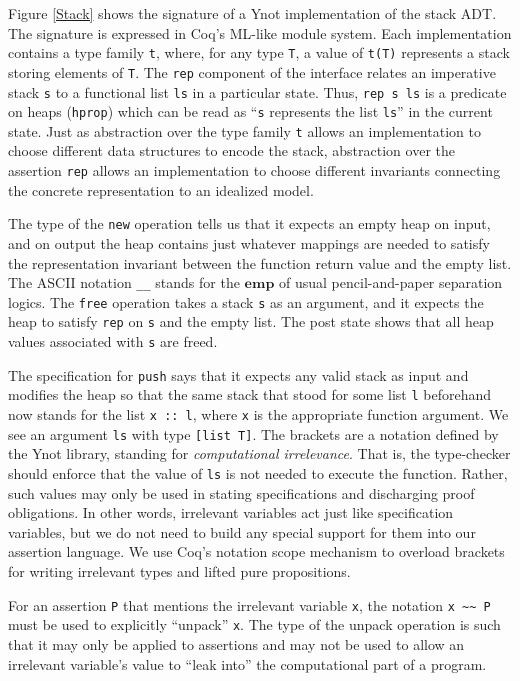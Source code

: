 \documentclass[preprint,nocopyrightspace]{sigplanconf}
\newcommand{\cd}[1]{\texttt{#1}}
\newcommand{\emp}{\mathbf{emp}}
\begin{document}
Figure \ref{Stack} shows the signature of a Ynot implementation of the
stack ADT.  The signature is expressed in Coq's ML-like module system.
Each implementation contains a type family \cd{t}, where, for any
type \cd{T}, a value of \cd{t(T)} represents a stack storing elements
of \cd{T}.  The \cd{rep} component of the interface relates an
imperative stack \cd{s} to a functional list \cd{ls} in a
particular state.  Thus, \cd{rep s ls} is a predicate on heaps
(\cd{hprop}) which can be read as ``\cd{s} represents the list \cd{ls}'' in the
current state.  Just as abstraction over the type family \cd{t} allows
an implementation to choose different data structures to encode the
stack, abstraction over the assertion \cd{rep} allows an
implementation to choose different invariants connecting the concrete
representation to an idealized model.  

The type of the \cd{new} operation tells us that it expects an empty heap on input, and on output the heap contains just whatever mappings are needed to satisfy the representation invariant between the function return value and the empty list.  The ASCII notation \cd{\_\_} stands for the $\emp$ of usual pencil-and-paper separation logics.  The \cd{free} operation takes a stack \cd{s} as an argument, and it expects the heap to satisfy \cd{rep} on \cd{s} and the empty list.  The post state shows that all heap values associated with \cd{s} are freed.

The specification for \cd{push} says that it expects any valid stack as input and modifies the heap so that the same stack that stood for some list \cd{l} beforehand now stands for the list \cd{x :: l}, where \cd{x} is the appropriate function argument.  We see an argument \cd{ls} with type \cd{[list T]}.  The brackets are a notation defined by the Ynot library, standing for \emph{computational irrelevance}.  That is, the type-checker should enforce that the value of \cd{ls} is not needed to execute the function.  Rather, such values may only be used in stating specifications and discharging proof obligations.  In other words, irrelevant variables act just like specification variables, but we do not need to build any special support for them into our assertion language.  We use Coq's notation scope mechanism to overload brackets for writing irrelevant types and lifted pure propositions.

For an assertion \cd{P} that mentions the irrelevant variable \cd{x}, the notation \cd{x \textasciitilde\textasciitilde \; P} must be used to explicitly ``unpack'' \cd{x}.  The type of the unpack operation is such that it may only be applied to assertions and may not be used to allow an irrelevant variable's value to ``leak into'' the computational part of a program.
\end{document}
